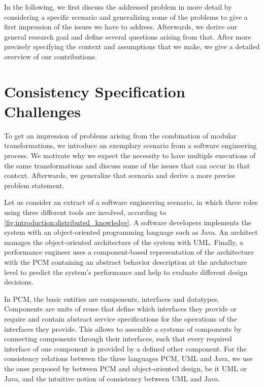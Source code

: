 In the following, we first discuss the addressed problem in more detail by considering a specific scenario and generalizing some of the problems to give a first impression of the issues we have to address.
Afterwards, we derive our general research goal and define several questions arising from that.
After more precisely specifying the context and assumptions that we make, we give a detailed overview of our contributions.



\section{Consistency Specification Challenges}

To get an impression of problems arising from the combination of modular transformations, we introduce an exemplary scenario from a software engineering process.
We motivate why we expect the necessity to have multiple executions of the same transformations and discuss some of the issues that can occur in that context.
Afterwards, we generalize that scenario and derive a more precise problem statement.

Let us consider an extract of a software engineering scenario, in which three roles using three different tools are involved, according to \autoref{fig:introduction:distributed_knowledge}. 
A software developers implements the system with an object-oriented programming language such as Java.
An architect manages the object-oriented architecture of the system with \gls{UML}. 
Finally, a performance engineer uses a component-based representation of the architecture with the \gls{PCM} containing an abstract behavior description at the architecture level to predict the system's performance and help to evaluate different design decisions.

In \gls{PCM}, the basic entities are components, interfaces and datatypes.
Components are units of reuse that define which interfaces they provide or require and contain abstract service specifications for the operations of the interfaces they provide.
This allows to assemble a systems of components by connecting components through their interfaces, such that every required interface of one component is provided by a defined other component.
For the consistency relations between the three languages \gls{PCM}, \gls{UML} and Java, we use the ones proposed by \textcite{langhammer2017a} between \gls{PCM} and object-oriented design, be it \gls{UML} or Java, and the intuitive notion of consistency between \gls{UML} and Java.


